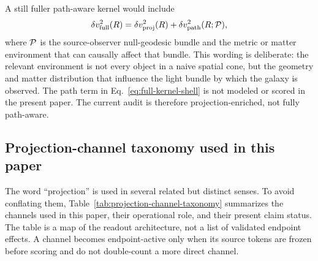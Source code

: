 \documentclass[11pt]{article}
\begin{document}
A still fuller path-aware kernel would include
\begin{equation}
  \delta v_{\rm full}^2(R)
  =
  \delta v_{\rm proj}^2(R)
  +
  \delta v_{\rm path}^2(R;{\cal P}),
  \label{eq:full-kernel-shell}
\end{equation}
where \({\cal P}\) is the source-observer null-geodesic bundle and the metric
or matter environment that can causally affect that bundle.  This wording is
deliberate: the relevant environment is not every object in a naive spatial
cone, but the geometry and matter distribution that influence the light bundle
by which the galaxy is observed.  The path term in
Eq.~\eqref{eq:full-kernel-shell} is not modeled or scored in the present paper.
The current audit is therefore projection-enriched, not fully path-aware.

\subsection{Projection-channel taxonomy used in this paper}
\label{subsec:projection-channel-taxonomy}

The word ``projection'' is used in several related but distinct senses.  To
avoid conflating them, Table~\ref{tab:projection-channel-taxonomy} summarizes
the channels used in this paper, their operational role, and their present
claim status.  The table is a map of the readout architecture, not a list of
validated endpoint effects.  A channel becomes endpoint-active only when its
source tokens are frozen before scoring and do not double-count a more direct
channel.
\end{document}

